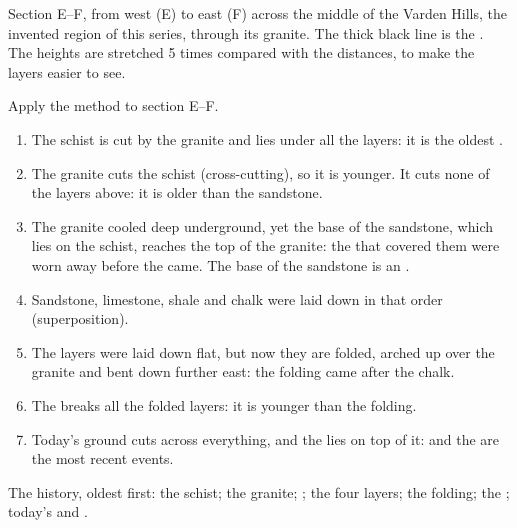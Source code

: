 \begin{omfigure}
\smallskip
{\small Section E--F, from west (E) to east (F) across the middle of the
Varden Hills, the invented region of this series, through its granite.
The thick black line is the . The heights are stretched 5 times
compared with the distances, to make the layers easier to see.}
\label{fig:g7:geological-time:section}
\end{omfigure}

\begin{example}\label{ex:g7:geological-time:varden}
Apply the method to section E--F.
\begin{enumerate}
  \item The schist is cut by the granite and lies under all the layers:
        it is the oldest .
  \item The granite cuts the schist (cross-cutting), so it is younger.
        It cuts none of the layers above: it is older than the
        sandstone.
  \item The granite cooled deep underground, yet the base of the
        sandstone, which lies on the schist, reaches the top of the
        granite: the  that covered them were worn away before the
         came. The base of the sandstone is an .
  \item Sandstone, limestone, shale and chalk were laid down in that
        order (superposition).
  \item The layers were laid down flat, but now they are folded, arched
        up over the granite and bent down further east: the folding came
        after the chalk.
  \item The  breaks all the folded layers: it is younger than the
        folding.
  \item Today's ground cuts across everything, and the   lies
        on top of it:  and the  are the most recent events.
\end{enumerate}
The history, oldest first: the schist; the granite; ; the four
layers; the folding; the ; today's  and  .
\end{example}

